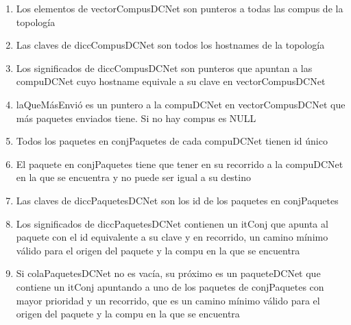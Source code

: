 \begin{enumerate}
	\item Los elementos de vectorCompusDCNet son punteros a todas las compus de
		la topología
	\item Las claves de diccCompusDCNet son todos los hostnames de la topología
	\item Los significados de diccCompusDCNet son punteros que apuntan a las
		compuDCNet cuyo hostname equivale a su clave en vectorCompusDCNet
	\item laQueMásEnvió es un puntero a la compuDCNet en vectorCompusDCNet que
		más paquetes enviados tiene. Si no hay compus es NULL
	\item Todos los paquetes en conjPaquetes de cada compuDCNet tienen id único
	\item El paquete en conjPaquetes tiene que tener en su recorrido a la
		compuDCNet en la que se encuentra y no puede ser igual a su destino
	\item Las claves de diccPaquetesDCNet son los id de los paquetes en
		conjPaquetes 
	\item Los significados de diccPaquetesDCNet contienen un itConj que apunta al
		paquete con el id equivalente a su clave y en recorrido, un camino
		mínimo válido para el origen del paquete y la compu en la que se
		encuentra
	\item Si colaPaquetesDCNet no es vacía, su próximo es un paqueteDCNet que
		contiene un itConj apuntando a uno de los paquetes de conjPaquetes con
		mayor prioridad y un recorrido, que es un camino mínimo válido para el
		origen del paquete y la compu en la que se encuentra
\end{enumerate}


